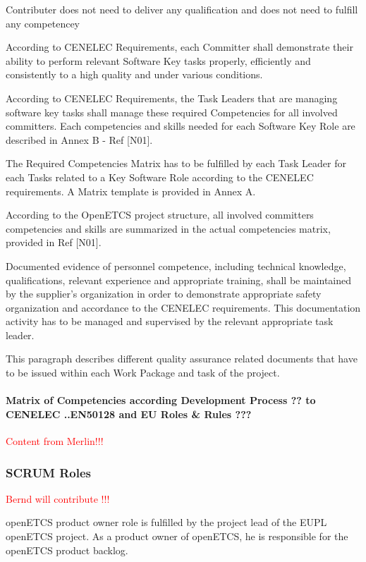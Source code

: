 \documentclass{template/openetcs_article}
\begin{document}
Contributer does not need to deliver any qualification and does not need to fulfill any competencey

According to CENELEC Requirements, each Committer shall demonstrate their ability to perform relevant Software Key tasks properly, efficiently and consistently to a high quality and under various conditions.

According to CENELEC Requirements, the Task Leaders that are managing software key tasks shall manage these required Competencies for all involved committers. Each competencies and skills needed for each Software Key Role are described in Annex B - Ref [N01].

The Required Competencies Matrix has to be fulfilled by each Task Leader for each Tasks related to a Key Software Role according to the CENELEC requirements. A Matrix template is provided in Annex A.

According to the OpenETCS project structure, all involved committers competencies and skills are summarized in the actual competencies matrix, provided in Ref [N01].

Documented evidence of personnel competence, including technical knowledge, qualifications, relevant experience and appropriate training, shall be maintained by the supplier{\textquoteright}s organization in order to demonstrate appropriate safety organization and accordance to the CENELEC requirements. This documentation activity has to be managed and supervised by the relevant appropriate task leader.


This paragraph describes different quality assurance related documents that have to be issued within each Work Package and task of the project.


\paragraph{Matrix of Competencies according Development Process ?? to CENELEC ..EN50128 and EU Roles \& Rules ???}
\textcolor{red}{Content from Merlin!!!}


\subsubsection{SCRUM Roles}
\textcolor{red}{Bernd will contribute !!!}

openETCS product owner role is fulfilled by the project lead of the EUPL openETCS project. As a product owner of openETCS, he is responsible for the openETCS product backlog.
\end{document}
